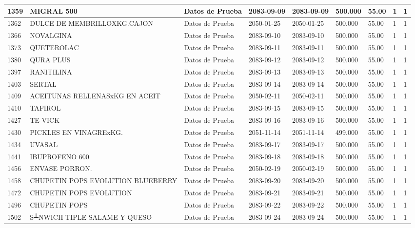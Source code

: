 \documentclass[a4paper,12pt]{article}
\begin{document}
\begin{landscape}
\begin{longtable}{|p{4cm}|p{2.5cm}|p{2.5cm}|p{1.8cm}|p{1.8cm}|p{1cm}|p{1cm}|p{3cm}|p{3cm}||}
1359 & MIGRAL 500 & Datos de Prueba & 2083-09-09 & 2083-09-09 & 500.000 & 55.00 & 1 & 1 \\ \hline 
1362 & DULCE DE MEMBRILLOXKG.CAJON & Datos de Prueba & 2050-01-25 & 2050-01-25 & 500.000 & 55.00 & 1 & 1 \\ \hline 
1366 & NOVALGINA & Datos de Prueba & 2083-09-10 & 2083-09-10 & 500.000 & 55.00 & 1 & 1 \\ \hline 
1373 & QUETEROLAC & Datos de Prueba & 2083-09-11 & 2083-09-11 & 500.000 & 55.00 & 1 & 1 \\ \hline 
1380 & QURA PLUS & Datos de Prueba & 2083-09-12 & 2083-09-12 & 500.000 & 55.00 & 1 & 1 \\ \hline 
1397 & RANITILINA & Datos de Prueba & 2083-09-13 & 2083-09-13 & 500.000 & 55.00 & 1 & 1 \\ \hline 
1403 & SERTAL & Datos de Prueba & 2083-09-14 & 2083-09-14 & 500.000 & 55.00 & 1 & 1 \\ \hline 
1409 & ACEITUNAS RELLENASxKG EN ACEIT & Datos de Prueba & 2050-02-11 & 2050-02-11 & 500.000 & 55.00 & 1 & 1 \\ \hline 
1410 & TAFIROL & Datos de Prueba & 2083-09-15 & 2083-09-15 & 500.000 & 55.00 & 1 & 1 \\ \hline 
1427 & TE VICK & Datos de Prueba & 2083-09-16 & 2083-09-16 & 500.000 & 55.00 & 1 & 1 \\ \hline 
1430 & PICKLES EN VINAGRExKG. & Datos de Prueba & 2051-11-14 & 2051-11-14 & 499.000 & 55.00 & 1 & 1 \\ \hline 
1434 & UVASAL & Datos de Prueba & 2083-09-17 & 2083-09-17 & 500.000 & 55.00 & 1 & 1 \\ \hline 
1441 & IBUPROFENO 600 & Datos de Prueba & 2083-09-18 & 2083-09-18 & 500.000 & 55.00 & 1 & 1 \\ \hline 
1456 & ENVASE PORRON. & Datos de Prueba & 2050-02-19 & 2050-02-19 & 500.000 & 55.00 & 1 & 1 \\ \hline 
1458 & CHUPETIN POPS EVOLUTION BLUEBERRY & Datos de Prueba & 2083-09-20 & 2083-09-20 & 500.000 & 55.00 & 1 & 1 \\ \hline 
1472 & CHUPETIN POPS EVOLUTION & Datos de Prueba & 2083-09-21 & 2083-09-21 & 500.000 & 55.00 & 1 & 1 \\ \hline 
1496 & CHUPETIN POPS & Datos de Prueba & 2083-09-22 & 2083-09-22 & 500.000 & 55.00 & 1 & 1 \\ \hline 
1502 & S┴NWICH TIPLE SALAME Y QUESO & Datos de Prueba & 2083-09-24 & 2083-09-24 & 500.000 & 55.00 & 1 & 1 \\ \hline 

\end{longtable}
\end{landscape}
\end{document}
